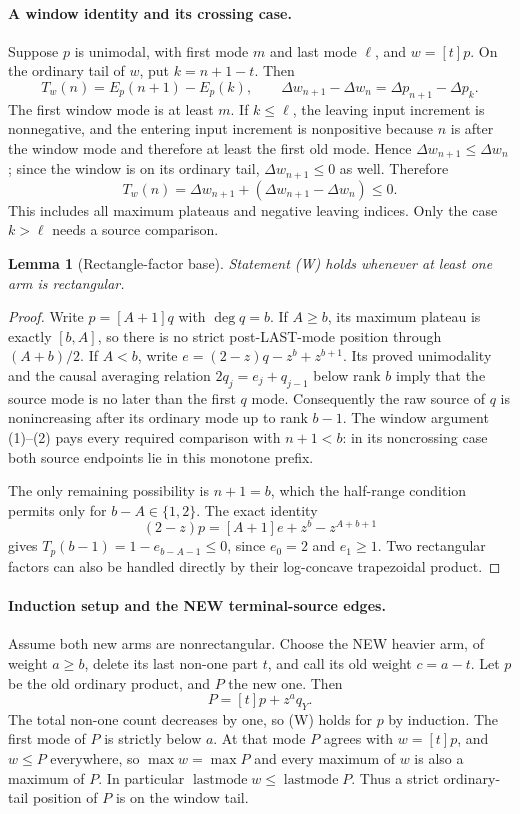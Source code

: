 \documentclass[11pt]{article}
\newtheorem{lemma}[proposition]{Lemma}
\begin{document}
\paragraph{A window identity and its crossing case.}
Suppose $p$ is unimodal, with first mode $m$ and last mode $\ell$,
and $w=[t]p$. On the ordinary tail of $w$, put $k=n+1-t$.
Then
\[
 T_w(n)=E_p(n+1)-E_p(k),\qquad
 \Delta w_{n+1}-\Delta w_n=\Delta p_{n+1}-\Delta p_k.   \tag{1}
\]
The first window mode is at least $m$. If $k\le\ell$, the leaving
input increment is nonnegative, and the entering input increment is
nonpositive because $n$ is after the window mode and therefore at least
the first old mode. Hence $\Delta w_{n+1}\le\Delta w_n$; since the window
is on its ordinary tail, $\Delta w_{n+1}\le0$ as well. Therefore
\[
 T_w(n)=\Delta w_{n+1}+(\Delta w_{n+1}-\Delta w_n)\le0. \tag{2}
\]
This includes all maximum plateaus and negative leaving indices.
Only the case $k>\ell$ needs a source comparison.

\begin{lemma}[Rectangle-factor base]
Statement (W) holds whenever at least one arm is rectangular.
\end{lemma}
\begin{proof}
Write $p=[A+1]q$ with $\deg q=b$.
If $A\ge b$, its maximum plateau is exactly $[b,A]$, so there is no
strict post-LAST-mode position through $(A+b)/2$.
If $A<b$, write $e=(2-z)q-z^b+z^{b+1}$. Its proved unimodality and
the causal averaging relation $2q_j=e_j+q_{j-1}$ below rank $b$ imply
that the source mode is no later than the first $q$ mode. Consequently
the raw source of $q$ is nonincreasing after its ordinary mode up to
rank $b-1$. The window argument (1)--(2) pays every required comparison
with $n+1<b$: in its noncrossing case both source endpoints lie in
this monotone prefix.

The only remaining possibility is $n+1=b$, which the half-range
condition permits only for $b-A\in\{1,2\}$. The exact identity
\[
                  (2-z)p=[A+1]e+z^b-z^{A+b+1}
\]
gives
$T_p(b-1)=1-e_{b-A-1}\le0$, since $e_0=2$ and $e_1\ge1$.
Two rectangular factors can also be handled directly by their
log-concave trapezoidal product.
\end{proof}

\paragraph{Induction setup and the NEW terminal-source edges.}
Assume both new arms are nonrectangular. Choose the NEW heavier arm,
of weight $a\ge b$, delete its last non-one part $t$, and call its
old weight $c=a-t$. Let $p$ be the old ordinary product, and $P$ the
new one. Then
\[
                          P=[t]p+z^a q_Y.              \tag{3}
\]
The total non-one count decreases by one, so (W) holds for $p$ by
induction. The first mode of $P$ is strictly below $a$.
At that mode $P$ agrees with $w=[t]p$, and $w\le P$ everywhere,
so $\max w=\max P$ and every maximum of $w$ is also a maximum of $P$.
In particular
$\operatorname{lastmode}w\le\operatorname{lastmode}P$.
Thus a strict ordinary-tail position of $P$ is on the window tail.
\end{document}
